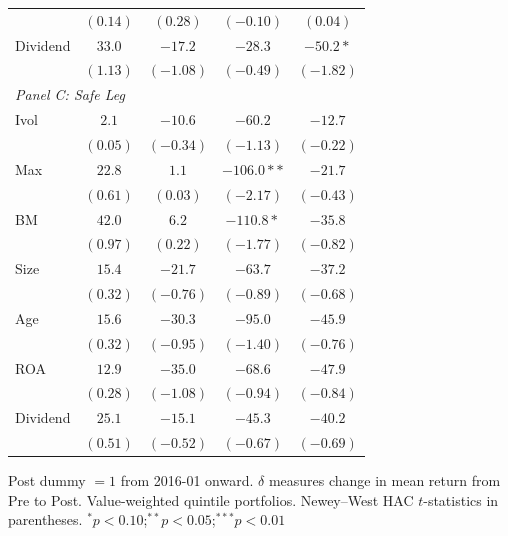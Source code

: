 \begin{tabular}{l c c c c}
 & $(0.14)$ & $(0.28)$ & $(-0.10)$ & $(0.04)$ \\
Dividend & $33.0$ & $-17.2$ & $-28.3$ & $-50.2*$ \\
 & $(1.13)$ & $(-1.08)$ & $(-0.49)$ & $(-1.82)$ \\
\midrule
\multicolumn{5}{l}{\textit{Panel C: Safe Leg}} \\
Ivol & $2.1$ & $-10.6$ & $-60.2$ & $-12.7$ \\
 & $(0.05)$ & $(-0.34)$ & $(-1.13)$ & $(-0.22)$ \\
Max & $22.8$ & $1.1$ & $-106.0**$ & $-21.7$ \\
 & $(0.61)$ & $(0.03)$ & $(-2.17)$ & $(-0.43)$ \\
BM & $42.0$ & $6.2$ & $-110.8*$ & $-35.8$ \\
 & $(0.97)$ & $(0.22)$ & $(-1.77)$ & $(-0.82)$ \\
Size & $15.4$ & $-21.7$ & $-63.7$ & $-37.2$ \\
 & $(0.32)$ & $(-0.76)$ & $(-0.89)$ & $(-0.68)$ \\
Age & $15.6$ & $-30.3$ & $-95.0$ & $-45.9$ \\
 & $(0.32)$ & $(-0.95)$ & $(-1.40)$ & $(-0.76)$ \\
ROA & $12.9$ & $-35.0$ & $-68.6$ & $-47.9$ \\
 & $(0.28)$ & $(-1.08)$ & $(-0.94)$ & $(-0.84)$ \\
Dividend & $25.1$ & $-15.1$ & $-45.3$ & $-40.2$ \\
 & $(0.51)$ & $(-0.52)$ & $(-0.67)$ & $(-0.69)$ \\
\bottomrule
\end{tabular}
\vspace{4pt}
\begin{minipage}{0.9\textwidth}
\footnotesize
Post dummy $=1$ from 2016-01 onward. $\delta$ measures change in mean return from Pre to Post.
Value-weighted quintile portfolios. Newey--West HAC $t$-statistics in parentheses.
$^{*}p<0.10$;\quad $^{**}p<0.05$;\quad $^{***}p<0.01$
\end{minipage}